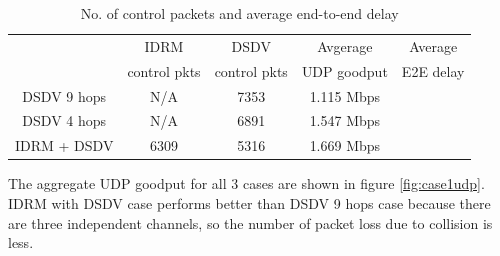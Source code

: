 \begin{table}[htb!]
\center
\begin{tabular}{|c||c|c|c|c|}
\hline
 & IDRM & DSDV & Avgerage & Average\\
 & control pkts & control pkts & UDP goodput & E2E delay \\
\hline
DSDV 9 hops & N/A & 7353 & 1.115 Mbps &\\
\hline
DSDV 4 hops & N/A & 6891 & 1.547 Mbps &\\
\hline
IDRM + DSDV & 6309 & 5316 & 1.669 Mbps &\\
\hline
\end{tabular}
\caption{No. of control packets and average end-to-end delay}
\label{table:case1overhead}
\end{table}

The aggregate UDP goodput for all 3 cases are shown in figure \ref{fig:case1udp}.
IDRM with DSDV case performs better than DSDV 9 hops case because 
there are three independent channels, so the number of packet loss due to collision is less.

